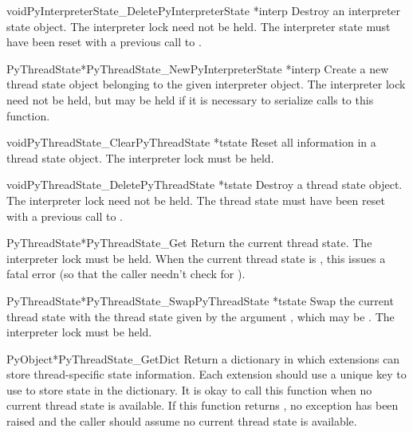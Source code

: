 \begin{cfuncdesc}{void}{PyInterpreterState_Delete}{PyInterpreterState *interp}
  Destroy an interpreter state object.  The interpreter lock need not
  be held.  The interpreter state must have been reset with a previous
  call to .
\end{cfuncdesc}

\begin{cfuncdesc}{PyThreadState*}{PyThreadState_New}{PyInterpreterState *interp}
  Create a new thread state object belonging to the given interpreter
  object.  The interpreter lock need not be held, but may be held if
  it is necessary to serialize calls to this function.
\end{cfuncdesc}

\begin{cfuncdesc}{void}{PyThreadState_Clear}{PyThreadState *tstate}
  Reset all information in a thread state object.  The interpreter lock
  must be held.
\end{cfuncdesc}

\begin{cfuncdesc}{void}{PyThreadState_Delete}{PyThreadState *tstate}
  Destroy a thread state object.  The interpreter lock need not be
  held.  The thread state must have been reset with a previous call to
  .
\end{cfuncdesc}

\begin{cfuncdesc}{PyThreadState*}{PyThreadState_Get}{}
  Return the current thread state.  The interpreter lock must be
  held.  When the current thread state is \NULL, this issues a fatal
  error (so that the caller needn't check for \NULL).
\end{cfuncdesc}

\begin{cfuncdesc}{PyThreadState*}{PyThreadState_Swap}{PyThreadState *tstate}
  Swap the current thread state with the thread state given by the
  argument , which may be \NULL.  The interpreter lock
  must be held.
\end{cfuncdesc}

\begin{cfuncdesc}{PyObject*}{PyThreadState_GetDict}{}
  Return a dictionary in which extensions can store thread-specific
  state information.  Each extension should use a unique key to use to
  store state in the dictionary.  It is okay to call this function
  when no current thread state is available.
  If this function returns \NULL, no exception has been raised and the
  caller should assume no current thread state is available.
\end{cfuncdesc}

